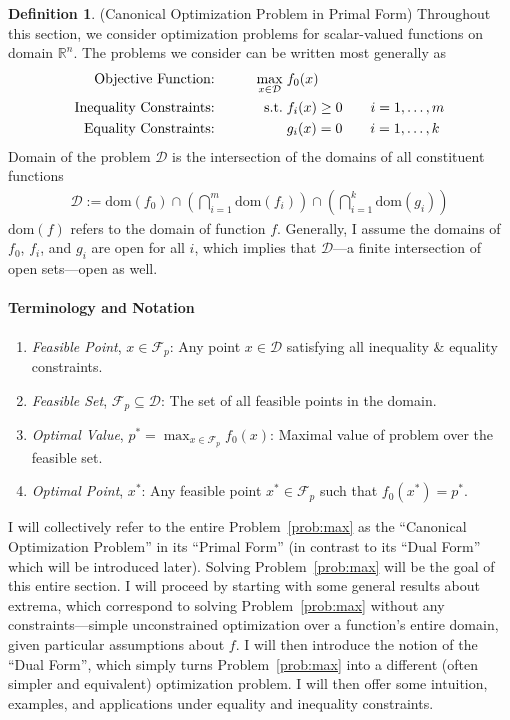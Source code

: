 \documentclass[12pt]{article}
\numberwithin{equation}{section} %
\theoremstyle{plain}
\theoremstyle{definition}
\newtheorem{defn}[thm]{Definition}
\theoremstyle{remark}
\newcommand{\dom}{\text{dom}}
\newcommand{\calD}{\mathcal{D}}
\newcommand{\Rn}{\mathbb{R}^n}
\begin{document}
\begin{defn}(Canonical Optimization Problem in Primal Form)
Throughout this section, we consider optimization problems for
scalar-valued functions on domain $\Rn$. The problems we consider can be
written most generally as
\begin{alignat}{3}
  \text{Objective Function:} \qquad
    && \max_{x\in\mathcal{D}} \; &f_0(x) \label{prob:max}\\
  \text{Inequality Constraints:} \qquad
    && \text{s.t.} \; &f_i(x) \geq 0 \qquad i = 1,\ldots, m\notag \\
  \text{Equality Constraints:} \qquad
    && &g_i(x) = 0 \qquad i = 1,\ldots,k\notag
\end{alignat}
Domain of the problem $\mathcal{D}$ is the intersection of the domains
of all constituent functions
\begin{align*}
  \mathcal{D} := \dom(f_0)
  \cap \left( \bigcap^m_{i=1} \dom(f_i)\right)
  \cap \left( \bigcap^k_{i=1} \dom(g_i)\right)
\end{align*}
$\dom(f)$ refers to the domain of function $f$. Generally, I
assume the domains of $f_0$, $f_i$, and $g_i$ are open for all $i$,
which implies that $\mathcal{D}$---a finite intersection of open
sets---open as well.

\paragraph{Terminology and Notation}
\begin{enumerate}
  \item \emph{Feasible Point}, $x\in\mathscr{F}_p$: Any point
    $x\in\mathcal{D}$ satisfying all inequality \& equality
    constraints.
  \item \emph{Feasible Set}, $\mathscr{F}_p\subseteq\calD$:
    The set of all feasible points in the domain.
  \item \emph{Optimal Value}, $p^*=\max_{x\in \mathscr{F}_p} f_0(x)$:
    Maximal value of problem over the feasible set.
  \item \emph{Optimal Point}, $x^*$: Any feasible point
    $x^*\in\mathscr{F}_p$ such that $f_0(x^*)=p^*$.
\end{enumerate}
I will collectively refer to the entire Problem~\ref{prob:max} as the
``Canonical Optimization Problem'' in its ``Primal Form'' (in contrast
to its ``Dual Form'' which will be introduced later). Solving
Problem~\ref{prob:max} will be the goal of this entire section. I will
proceed by starting with some general results about extrema, which
correspond to solving Problem~\ref{prob:max} without any
constraints---simple unconstrained optimization over a function's entire
domain, given particular assumptions about $f$. I will then introduce
the notion of the ``Dual Form'', which simply turns
Problem~\ref{prob:max} into a different (often simpler and equivalent)
optimization problem. I will then offer some intuition, examples, and
applications under equality and inequality constraints.
\end{defn}
\end{document}
